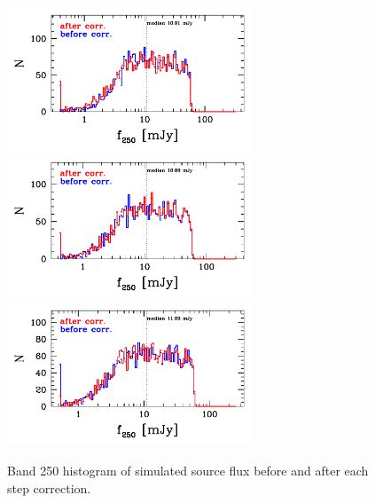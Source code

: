 \documentclass[11pt,a4paper]{article}
\begin{document}
\begin{figure}[H]
	\caption{
		Band 250 histogram of simulated source flux before and after each step correction. 
	}
	\includegraphics[width=0.65\textwidth]{galsim_250_hist_flux_1}
	\includegraphics[width=0.65\textwidth]{galsim_250_hist_flux_2}
	\includegraphics[width=0.65\textwidth]{galsim_250_hist_flux_3}
\end{figure}
\end{document}
